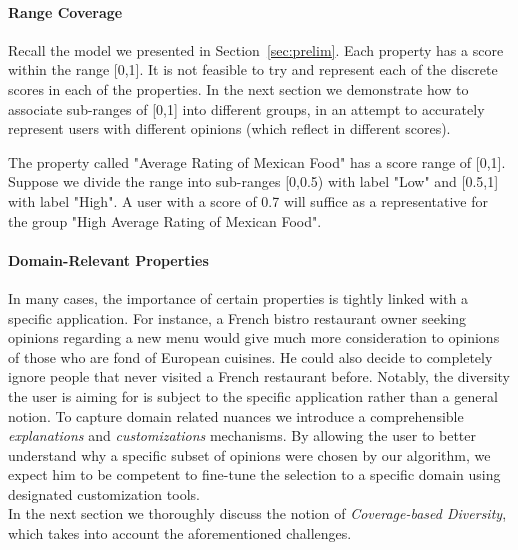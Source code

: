 \paragraph*{Range Coverage} Recall the model we presented in Section~\ref{sec:prelim}. Each property has a score within the range [0,1]. It is not feasible to try and represent each of the discrete scores in each of the properties. In the next section we demonstrate how to associate sub-ranges of [0,1] into different groups, in an attempt to accurately represent users with different opinions (which reflect in different scores).
\begin{example}
The property called "Average Rating of Mexican Food" has a score range of [0,1]. Suppose we divide the range into sub-ranges [0,0.5) with label "Low" and [0.5,1] with label "High". A user with a score of 0.7 will suffice as a representative for the group "High Average Rating of Mexican Food".
\end{example}

\paragraph*{Domain-Relevant Properties} 
In many cases, the importance of certain properties is tightly linked with a specific application. For instance, a French bistro restaurant owner seeking opinions regarding a new menu would give much more consideration to opinions of those who are fond of European cuisines. He could also decide to completely ignore people that never visited a French restaurant before. Notably, the diversity the user is aiming for is subject to the specific application rather than a general notion.
To capture domain related nuances we introduce a comprehensible \emph{explanations} and \emph{customizations} mechanisms. By allowing the user to better understand why a specific subset of opinions were chosen by our algorithm, we expect him to be competent to fine-tune the selection to a specific domain using designated customization tools.\\

In the next section we thoroughly discuss the notion of \emph{Coverage-based Diversity}, which takes into account the aforementioned challenges. 





